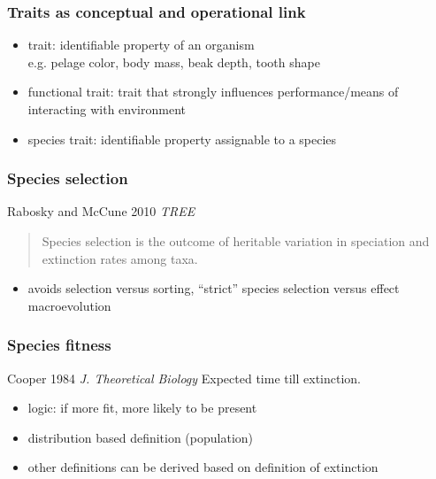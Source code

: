 \documentclass{beamer}
\begin{document}
\begin{frame}
  \frametitle{Traits as conceptual and operational link}

  \begin{definition}
    \begin{itemize}
      \item \alert{trait}: identifiable property of an organism \\e.g. pelage color, body mass, beak depth, tooth shape
      \item \alert{functional trait}: trait that strongly influences performance/means of interacting with environment
      \item \alert{species trait}: identifiable property assignable to a species
    \end{itemize}
  \end{definition}
\end{frame}

\begin{frame}
  \frametitle{Species selection}

  \begin{block}{Rabosky and McCune 2010 \em{TREE}}
    \begin{quote}
      Species selection is the outcome of heritable variation in speciation and extinction rates among taxa.
    \end{quote}
  \end{block}

  \begin{itemize}
    \item avoids selection versus sorting, ``strict'' species selection versus effect macroevolution
  \end{itemize}
\end{frame}

\begin{frame}
  \frametitle{Species fitness}

  \begin{block}{Cooper 1984 \em{J. Theoretical Biology}}
    Expected time till extinction.
  \end{block}


  \begin{itemize}
    \item \alert{logic:} if more fit, more likely to be present
    \item distribution based definition (population)
    \item other definitions can be derived based on definition of extinction
  \end{itemize}

\end{frame}
\end{document}
